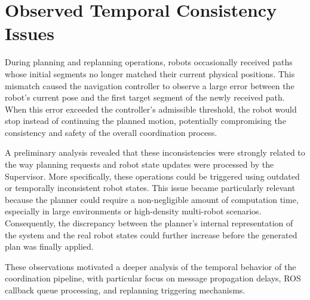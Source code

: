 \section{Observed Temporal Consistency Issues}
\label{sec:initial_issues}
\hspace{\parindent}
During planning and replanning operations, robots occasionally received paths whose initial segments no longer matched their current physical positions. This mismatch caused the navigation controller to observe a large error between the robot's current pose and the first target segment of the newly received path. When this error exceeded the controller's admissible threshold, the robot would stop instead of continuing the planned motion, potentially compromising the consistency and safety of the overall coordination process.

A preliminary analysis revealed that these inconsistencies were strongly related to the way planning requests and robot state updates were processed by the Supervisor. More specifically, these operations could be triggered using outdated or temporally inconsistent robot states.
This issue became particularly relevant because the planner could require a non-negligible amount of computation time, especially in large environments or high-density multi-robot scenarios. Consequently, the discrepancy between the planner's internal representation of the system and the real robot states could further increase before the generated plan was finally applied.

These observations motivated a deeper analysis of the temporal behavior of the coordination pipeline, with particular focus on message propagation delays, ROS callback queue processing, and replanning triggering mechanisms.